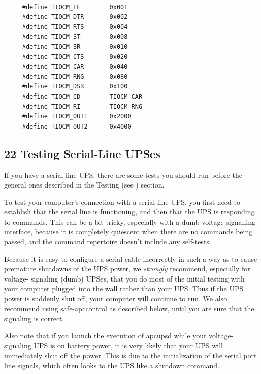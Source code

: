 {{{{{{{{{{\label{index-Cables-218}

\footnotesize
\begin{verbatim}
     
     #define TIOCM_LE        0x001
     #define TIOCM_DTR       0x002
     #define TIOCM_RTS       0x004
     #define TIOCM_ST        0x008
     #define TIOCM_SR        0x010
     #define TIOCM_CTS       0x020
     #define TIOCM_CAR       0x040
     #define TIOCM_RNG       0x080
     #define TIOCM_DSR       0x100
     #define TIOCM_CD        TIOCM_CAR
     #define TIOCM_RI        TIOCM_RNG
     #define TIOCM_OUT1      0x2000
     #define TIOCM_OUT2      0x4000
\end{verbatim}
\normalsize

\label{Testing-Serial_002dLine-UPSes}

\subsection*{22 Testing Serial-Line UPSes}

\label{index-Testing_002c-Serial-219}
\label{index-Serial_002c-Testing-220}
If you have a serial-line UPS, there are some tests you should run before the
general ones described in the Testing (see 
) section.  

To test your computer's connection with a serial-line UPS, you first need to
establish that the serial line is functioning, and then that the UPS is
responding to commands.  This can be a bit tricky, especially with a dumb
voltage-signalling interface, because it is completely quiescent when there
are no commands being passed, and the command repertoire doesn't include any
self-tests.  

Because it is easy to configure a serial cable incorrectly in such a way as to
cause premature shutdowns of the UPS power, we {\it strongly} recommend,
especially for voltage- signaling (dumb) UPSes, that you do most of the
initial testing with your computer plugged into the wall rather than your UPS.
Thus if the UPS power is suddenly shut off, your computer will continue to
run. We also recommend using safe-apccontrol as described below, until you are
sure that the signaling is correct.  

Also note that if you launch the execution of apcupsd while your
voltage-signaling UPS is on battery power, it is very likely that your UPS
will immediately shut off the power. This is due to the initialization of the
serial port line signals, which often looks to the UPS like a shutdown
command.  

}}}}}}}}}}
